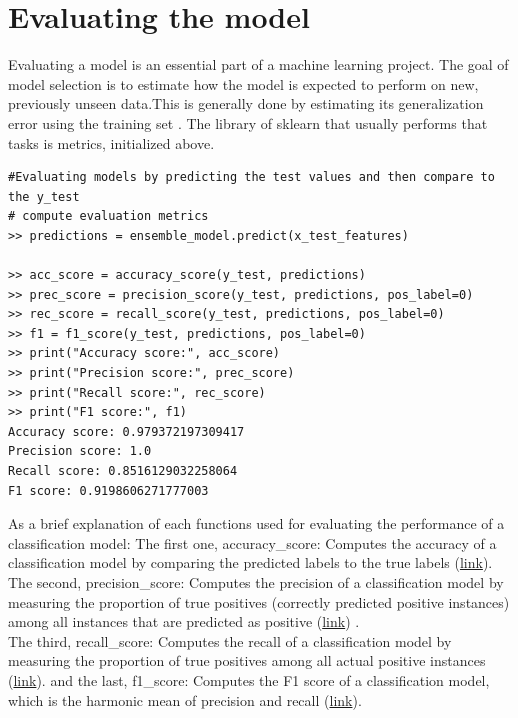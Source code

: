 \documentclass[12pt,a4paper]{article}
\begin{document}
\section{Evaluating the model}
Evaluating a model is an essential part of a machine learning project. The goal of model selection is to estimate how the model is expected to perform on new, previously unseen data.This is generally done by estimating its generalization error using the training set \cite{geron2022hands}. The library of sklearn that usually performs that tasks is metrics, initialized above.  
\begin{verbatim}
#Evaluating models by predicting the test values and then compare to the y_test
# compute evaluation metrics 
>> predictions = ensemble_model.predict(x_test_features) 

>> acc_score = accuracy_score(y_test, predictions)
>> prec_score = precision_score(y_test, predictions, pos_label=0)
>> rec_score = recall_score(y_test, predictions, pos_label=0)
>> f1 = f1_score(y_test, predictions, pos_label=0) 
>> print("Accuracy score:", acc_score)
>> print("Precision score:", prec_score)
>> print("Recall score:", rec_score)
>> print("F1 score:", f1)
Accuracy score: 0.979372197309417
Precision score: 1.0
Recall score: 0.8516129032258064
F1 score: 0.9198606271777003
\end{verbatim} 
As a brief explanation of each functions used for evaluating the performance of a classification model: The first one, accuracy\_score: Computes the accuracy of a classification model by comparing the predicted labels to the true labels (\href{https://scikit-learn.org/stable/modules/generated/sklearn.metrics.accuracy_score.html}{link}).
\\The second, precision\_score: Computes the precision of a classification model by measuring the proportion of true positives (correctly predicted positive instances) among all instances that are predicted as positive (\href{https://scikit-learn.org/stable/modules/generated/sklearn.metrics.precision_score.html}{link}) . \\
The third, recall\_score: Computes the recall of a classification model by measuring the proportion of true positives among all actual positive instances (\href{https://scikit-learn.org/stable/modules/generated/sklearn.metrics.recall_score.html}{link}). and the last, f1\_score: Computes the F1 score of a classification model, which is the harmonic mean of precision and recall (\href{https://scikit-learn.org/stable/modules/generated/sklearn.metrics.f1_score.html}{link}). 
\end{document}
